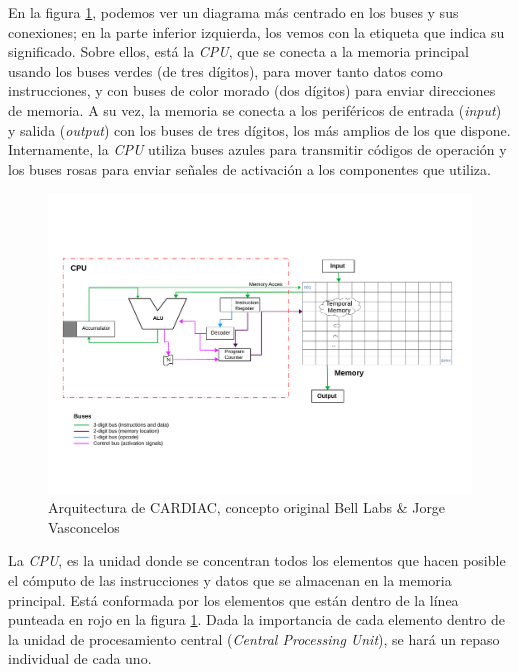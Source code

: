\documentclass[letterpaper,12pt,oneside]{book}
\begin{document}

	En la figura \ref{fig:Arquitectura_diagrama_original}, podemos ver un diagrama
	más centrado en los buses y sus conexiones; en la parte inferior izquierda, 
	los vemos con la etiqueta que indica su significado. Sobre ellos, está la \textit{CPU},
	que se conecta a la memoria principal usando los 
	buses verdes (de tres dígitos),
	para mover tanto datos como instrucciones, y
	con buses de color morado (dos dígitos) para enviar direcciones de memoria. A su vez, 
	la memoria se conecta a los periféricos de entrada (\textit{input})
	y salida (\textit{output}) con los buses de tres dígitos, los más amplios de los que dispone.
	Internamente, la \textit{CPU} utiliza buses azules para transmitir
	códigos de operación y los buses rosas para enviar señales de activación
	a los componentes que utiliza.	
	
	\begin{figure}[ht]
 			\centering
			\includegraphics[scale=0.5]{media/CARDIACC/Arquitectura_diagrama_original_100celdas.pdf}
			\caption{Arquitectura de CARDIAC, concepto original Bell Labs \& Jorge Vasconcelos}
			\label{fig:Arquitectura_diagrama_original}
	\end{figure}
	
	
	
	La \textit{CPU}, es la unidad donde se concentran todos los elementos que hacen 
	posible el cómputo de las instrucciones y datos
	que se almacenan en la memoria principal.
	Está conformada por los elementos que están dentro de la línea punteada en rojo en la figura
	 \ref{fig:Arquitectura_diagrama_original}. Dada la importancia
	de cada elemento dentro de la unidad de procesamiento central (\textit{Central Processing Unit}),
	se hará un repaso individual de cada uno.
	
\end{document}
